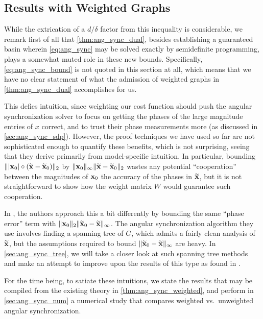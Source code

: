 \subsection{Results with Weighted Graphs}
While the extrication of a $d / \delta$ factor from this inequality is considerable, we remark first of all that \cref{thm:ang_sync_dual}, besides establishing a guaranteed basin wherein \eqref{eq:ang_sync} may be solved exactly by semidefinite programming, plays a somewhat muted role in these new bounds.  Specifically, \eqref{eq:ang_sync_bound} is not quoted in this section at all, which means that we have no clear statement of what the admission of weighted graphs in \cref{thm:ang_sync_dual} accomplishes for us.

This defies intuition, since weighting our cost function should push the angular synchronization solver to focus on getting the phases of the large magnitude entries of $x$ correct, and to trust their phase measurements more (as discussed in \cref{sec:ang_sync_sdp}).  However, the proof techniques we have used so far are not sophisticated enough to quantify these benefits, which is not surprising, seeing that they derive primarily from model-specific intuition.  In particular, bounding $\lVert|\mathbf{x}_0| \circ (\widetilde{\mathbf{x}} - \widetilde{\mathbf{x}}_0)\rVert_2$ by $\lVert\mathbf{x}_0\rVert_\infty \lVert\widetilde{\mathbf{x}} - \widetilde{\mathbf{x}}_0\rVert_2$ wastes any potential ``cooperation'' between the magnitudes of $\mathbf{x}_0$ the accuracy of the phases in $\widetilde{\mathbf{x}}$, but it is not straightforward to show how the weight matrix $W$ would guarantee such cooperation.

In \cite{IVW2015_FastPhase}, the authors approach this a bit differently by bounding the same ``phase error'' term with $\lVert\mathbf{x}_0\rVert_2 \lVert\widetilde{\mathbf{x}}_0 - \widetilde{\mathbf{x}}\rVert_\infty$.  The angular synchronization algorithm they use involves finding a spanning tree of $G$, which admits a fairly clean analysis of $\widetilde{\mathbf{x}}$, but the assumptions required to bound $\lVert\widetilde{\mathbf{x}}_0 - \widetilde{\mathbf{x}}\rVert_\infty$ are heavy.  In \cref{sec:ang_sync_tree}, we will take a closer look at such spanning tree methods and make an attempt to improve upon the results of this type as found in \cite{IVW2015_FastPhase}.

For the time being, to satiate these intuitions, we state the results that may be compiled from the existing theory in \cref{thm:ang_sync_weighted}, and perform in \cref{sec:ang_sync_num} a numerical study that compares weighted vs.~unweighted angular synchronization.

